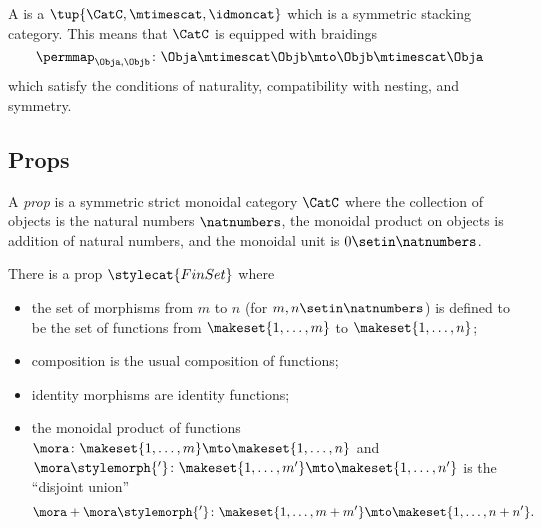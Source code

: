 
\begin{ctdefinition}
    \label{def:symmetric-strict-monoidal-cat}
    A  is a  $\tup{\CatC, \mtimescat, \idmoncat}$ which is a symmetric stacking category. 
    This means that $\CatC$ is equipped with braidings
    \begin{equation}
        \permmap_{\Obja, \Objb} \colon \Obja \mtimescat \Objb \mto \Objb \mtimescat \Obja \end{equation}
    which satisfy the conditions of naturality, compatibility with nesting, and symmetry.
\end{ctdefinition}


\subsection{Props}

\begin{ctdefinition}\label{def:prop}
    A \emph{prop} is a symmetric strict monoidal category $\CatC$ where the collection of objects is the natural numbers $\natnumbers$, the monoidal product on objects is addition of natural numbers, and the monoidal unit is $0 \setin \natnumbers$.
\end{ctdefinition}

\begin{example}\label{exa:prop-finset}
    There is a prop $\stylecat{FinSet}$ where
    \begin{itemize}
        \item the set of morphisms from $m$ to $n$ (for $m, n \setin \natnumbers$) is defined to be the set of functions from $\makeset{1, \dots, m}$ to $\makeset{1, \dots, n}$;
        \item composition is the usual composition of functions;
        \item identity morphisms are identity functions;
        \item the monoidal product of functions $\mora \colon \makeset{1, \dots, m} \mto \makeset{1, \dots, n}$ and $\mora\stylemorph{'} \colon \makeset{1, \dots, m'} \mto \makeset{1, \dots, n'}$ is the ``disjoint union''
              \begin{equation}
                  \mora + \mora\stylemorph{'} \colon \makeset{1, \dots, m + m'} \mto \makeset{1, \dots, n + n'}.
              \end{equation}
    \end{itemize}
\end{example}


